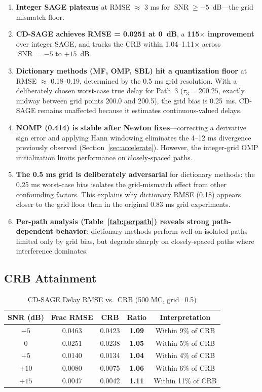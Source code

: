 \documentclass[a4paper,fleqn]{cas-dc}
\DeclareMathOperator{\SNR}{SNR}
\begin{document}
\begin{enumerate}
\item \textbf{Integer SAGE plateaus} at RMSE $\approx$ 3 ms for $\SNR \ge -5$~dB---the grid mismatch floor.
\item \textbf{CD-SAGE achieves RMSE = 0.0251 at 0~dB}, a \textbf{115$\times$ improvement} over integer SAGE, and tracks the CRB within 1.04--1.11$\times$ across $\SNR = -5$ to $+15$~dB.
\item \textbf{Dictionary methods (MF, OMP, SBL) hit a quantization floor} at RMSE $\approx$ 0.18--0.19, determined by the 0.5 ms grid resolution. With a deliberately chosen worst-case true delay for Path~3 ($\tau_3 = 200.25$, exactly midway between grid points 200.0 and 200.5), the grid bias is 0.25~ms. CD-SAGE remains unaffected because it estimates continuous-valued delays.
\item \textbf{NOMP (0.414) is stable after Newton fixes}---correcting a derivative sign error and applying Hann windowing eliminates the 4--12 ms divergence previously observed (Section~\ref{sec:accelerate}). However, the integer-grid OMP initialization limits performance on closely-spaced paths.
\item \textbf{The 0.5 ms grid is deliberately adversarial} for dictionary methods: the 0.25 ms worst-case bias isolates the grid-mismatch effect from other confounding factors. This explains why dictionary RMSE (0.18) appears closer to the grid floor than in the original 0.83 ms grid experiments.
\item \textbf{Per-path analysis (Table~\ref{tab:perpath}) reveals strong path-dependent behavior}: dictionary methods perform well on isolated paths limited only by grid bias, but degrade sharply on closely-spaced paths where interference dominates.
\end{enumerate}

\subsection{CRB Attainment}

\begin{table}[width=.9\linewidth,cols=5,pos=h]
\centering
\caption{CD-SAGE Delay RMSE vs.\ CRB (500 MC, grid=0.5)}
\label{tab:crb}
\small
\begin{tabular*}{\tblwidth}{@{}ccccc@{}}
\toprule
SNR (dB) & Frac RMSE & CRB & Ratio & Interpretation \\
\midrule
$-5$ & 0.0463 & 0.0423 & \textbf{1.09} & Within 9\% of CRB \\
$0$  & 0.0251 & 0.0238 & \textbf{1.05} & Within 5\% of CRB \\
$+5$ & 0.0140 & 0.0134 & \textbf{1.04} & Within 4\% of CRB \\
$+10$& 0.0080 & 0.0075 & \textbf{1.06} & Within 6\% of CRB \\
$+15$& 0.0047 & 0.0042 & \textbf{1.11} & Within 11\% of CRB \\
\bottomrule
\end{tabular*}
\end{table}
\end{document}
